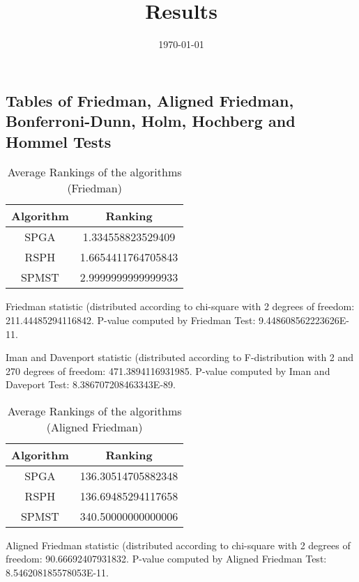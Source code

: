 \documentclass[a4paper,10pt]{article}
\title{Results}
\author{}
\date{\today}
\begin{document}
\begin{landscape}
\oddsidemargin 0in \topmargin 0in\maketitle
\section{Tables of Friedman, Aligned Friedman, Bonferroni-Dunn, Holm, Hochberg and Hommel Tests}
\begin{table}[!htp]
\centering
\caption{Average Rankings of the algorithms (Friedman)
}\begin{tabular}{c|c}
Algorithm&Ranking\\
\hline
SPGA&1.334558823529409\\
RSPH&1.6654411764705843\\
SPMST&2.9999999999999933\\
\end{tabular}
\end{table}


Friedman statistic (distributed according to chi-square with 2 degrees of freedom: 211.44485294116842. 
P-value computed by Friedman Test: 9.448608562223626E-11.\newline

Iman and Davenport statistic (distributed according to F-distribution with 2 and 270 degrees of freedom: 471.3894116931985. 
P-value computed by Iman and Daveport Test: 8.386707208463343E-89.\newline


\newpage

\begin{table}[!htp]
\centering
\caption{Average Rankings of the algorithms (Aligned Friedman)
}\begin{tabular}{c|c}
Algorithm&Ranking\\
\hline
SPGA&136.30514705882348\\
RSPH&136.69485294117658\\
SPMST&340.50000000000006\\
\end{tabular}
\end{table}


Aligned Friedman statistic (distributed according to chi-square with 2 degrees of freedom: 90.66692407931832. 
P-value computed by Aligned Friedman Test: 8.546208185578053E-11.\newline


\newpage


\end{landscape}
\end{document}
